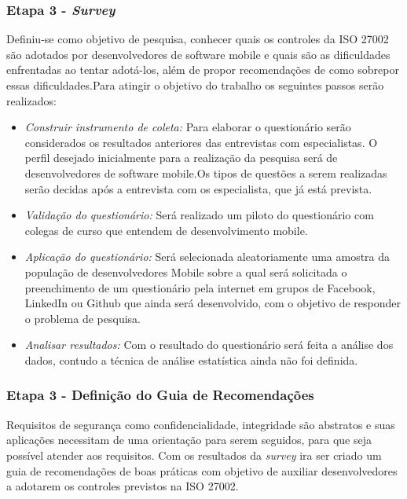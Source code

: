 \subsubsection{\textbf{Etapa 3 - \textit{Survey}}} Definiu-se como objetivo de pesquisa, conhecer quais os controles da ISO 27002 são adotados por desenvolvedores de software mobile e quais são as dificuldades enfrentadas ao tentar adotá-los, além de propor recomendações de como sobrepor essas dificuldades.Para atingir o objetivo do trabalho os seguintes passos serão realizados:
\begin{itemize}
\item \textit{Construir instrumento de coleta:} Para elaborar o questionário serão considerados os resultados anteriores das entrevistas com especialistas. O perfil desejado inicialmente para a realização da pesquisa será de desenvolvedores de software mobile.Os tipos de questões a serem realizadas serão decidas após a entrevista com os especialista, que já está prevista.

\item \textit{Validação do questionário:} Será realizado um piloto do questionário com colegas de curso que entendem de desenvolvimento mobile.


\item \textit{Aplicação do questionário:} Será selecionada aleatoriamente uma amostra da população de desenvolvedores Mobile sobre a qual será solicitada o preenchimento de um questionário pela internet em grupos de Facebook, LinkedIn ou Github que ainda será desenvolvido, com o objetivo de responder o problema de pesquisa.

\item \textit{Analisar resultados:} Com o resultado do questionário será feita a análise dos dados, contudo a técnica de análise estatística ainda não foi definida. 
\end{itemize}


\subsubsection{\textbf{Etapa 3 - Definição do Guia de Recomendações}}

Requisitos de segurança como confidencialidade, integridade são abstratos e suas aplicações necessitam de uma orientação para serem seguidos, para que seja possível atender aos requisitos. Com os resultados da \textit{survey} ira ser criado um guia de recomendações de boas práticas com objetivo de auxiliar desenvolvedores a adotarem os controles previstos na ISO 27002. 

